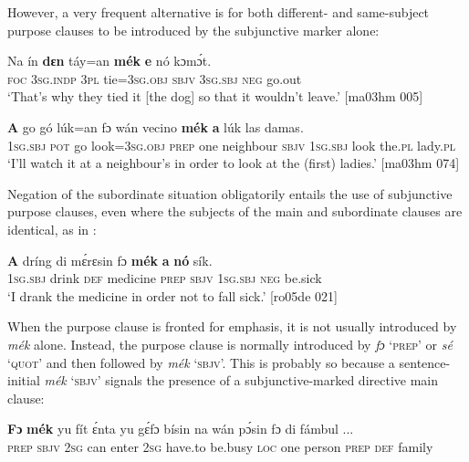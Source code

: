 However, a very frequent alternative is for both different-  and same-subject  purpose clauses to be introduced by the subjunctive marker alone:


\ea%
    \label{ex:key:1496}
    \gll Na  ín    \textbf{dɛn}  táy=an    \textbf{mék}    \textbf{e}   nó  kɔmɔ́t.\\
\textsc{foc}  \textsc{3sg.indp}  \textsc{3pl}  tie=\textsc{3sg.obj}  \textsc{sbjv}    \textsc{3sg.sbj}  \textsc{neg}  go.out\\

\glt ‘That’s why they tied it [the dog] so that it wouldn’t leave.’ [ma03hm 005]
\z


\ea%
    \label{ex:key:1497}
    \gll \textbf{A}   go  gó  lúk=an    fɔ  wán    vecino    \textbf{mék}    \textbf{a}   
lúk    las    damas.\\
\textsc{1sg.sbj}  \textsc{pot}  go  look=\textsc{3sg.obj}  \textsc{prep}  one    neighbour  \textsc{sbjv}    \textsc{1sg.sbj}  
look    the.\textsc{pl}  lady.\textsc{pl}\\
\glt ‘I’ll watch it at a neighbour’s in order to look at the (first) ladies.’ [ma03hm 074]
\z

Negation of the subordinate situation obligatorily entails the use of subjunctive purpose clauses, even where the subjects of the main and subordinate clauses are identical, as in : 


\ea%
    \label{ex:key:1498}
    \gll \textbf{A}    dríng  di  mɛ́rɛsin    fɔ  \textbf{mék}    \textbf{a}    \textbf{nó}  sík.\\
\textsc{1sg.sbj}  drink  \textsc{def}  medicine  \textsc{prep}  \textsc{sbjv}    \textsc{1sg.sbj}  \textsc{neg}  be.sick\\

\glt ‘I drank the medicine in order not to fall sick.’ [ro05de 021]
\z

When the purpose clause is fronted for emphasis, it is not usually introduced by \textit{mék} alone. Instead, the purpose clause is normally introduced by \textit{fɔ} ‘\textsc{prep}’ or \textit{sé} ‘\textsc{quot}’ and then followed by \textit{mék} ‘\textsc{sbjv}’. This is probably so because a sentence-initial \textit{mék} ‘\textsc{sbjv}’ signals the presence of a subjunctive-marked directive main clause: 


\ea%
    \label{ex:key:1499}
    \gll \textbf{Fɔ}  \textbf{mék}    yu  fít  ɛ́nta    yu  gɛ́fɔ    bísin  na  wán  pɔ́sin
fɔ  di  fámbul  \op...\cp{}\\
\textsc{prep}  \textsc{sbjv}    \textsc{2sg}  can  enter  \textsc{2sg}  have.to  be.busy  \textsc{loc}  one  person
\textsc{prep}  \textsc{def}  family\\

